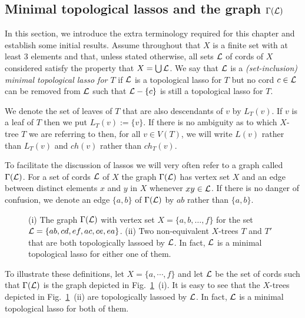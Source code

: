 \subsection{Minimal topological lassos and the graph $\Gamma({\mathcal L})$}
\label{sec:terminology}

In this section, we introduce the extra terminology required for this chapter
and establish some initial results.  Assume throughout that $X$ is a finite
set with at least 3 elements and that, unless stated otherwise, all sets ${\mathcal L}$
of cords of $X$ considered satisfy the property that $X=\bigcup {\mathcal L}$.  We say
that ${\mathcal L}$ is a {\em (set-inclusion) minimal topological lasso for $T$} if
${\mathcal L}$ is a topological lasso for $T$ but no cord $c \in {\mathcal L}$ can be removed
from ${\mathcal L}$ such that ${\mathcal L}-\{c\}$ is still a topological lasso for $T$.

We denote the set of leaves of $T$ that are also descendants of $v$ by
$L_T(v)$. If $v$ is a leaf of $T$ then we put $L_T(v):=\{v\}$. If there is no
ambiguity as to which $X$-tree $T$ we are referring to then, for all $v\in
V(T)$, we will write $L(v)$ rather than $L_T(v)$ and $ch(v)$ rather than
$ch_T(v)$.

To facilitate the discussion of lassos we will very often refer to a graph
called $\Gamma({\mathcal L})$.  For a set of cords ${\mathcal L}$ of $X$ the graph $\Gamma({\mathcal L})$
has vertex set $X$ and an edge between distinct elements $x$ and $y$ in $X$
whenever $xy \in {\mathcal L}$.  If there is no danger of confusion, we denote an edge
$\{a,b\}$ of $\Gamma({\mathcal L})$ by $ab$ rather than $\{a,b\}$.

\begin{figure}
  \begin{center}
    
  \end{center}
  \caption{(i) The graph $\Gamma({\mathcal L})$ with vertex set $X=\{a,b,\ldots,f\}$
    for the set ${\mathcal L}=\{ab,cd,ef,ac,ce,ea\}$. (ii) Two non-equivalent $X$-trees
    $T$ and $T'$ that are both topologically lassoed by ${\mathcal L}$. In fact, ${\mathcal L}$
    is a minimal topological lasso for either one of them.}
  \label{fig:block-graph-motivation}
\end{figure}

To illustrate these definitions, let $X=\{a,\cdots,f\}$ and let ${\mathcal L}$ be the
set of cords such that $\Gamma({\mathcal L})$ is the graph depicted in
Fig.~\ref{fig:block-graph-motivation}~(i).  It is easy to see that the
$X$-trees depicted in Fig.~\ref{fig:block-graph-motivation}~(ii) are
topologically lassoed by ${\mathcal L}$. In fact, ${\mathcal L}$ is a minimal topological lasso
for both of them.

